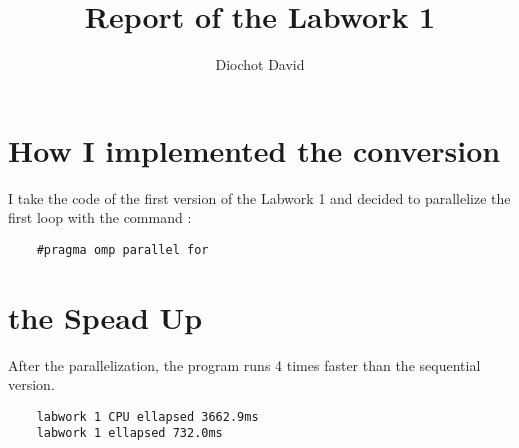 \documentclass[a4paper]{article}
\title{Report of the Labwork 1}
\author{Diochot David}
\begin{document}
\section{How I implemented the conversion}

I take the code of the first version of the Labwork 1 and decided to parallelize the first
loop with the command : 
\begin{verbatim}
    #pragma omp parallel for
\end{verbatim}

\section{the Spead Up}

After the parallelization, the program runs 4 times faster than the sequential version.

\begin{verbatim}
    labwork 1 CPU ellapsed 3662.9ms
    labwork 1 ellapsed 732.0ms
\end{verbatim}
\end{document}
